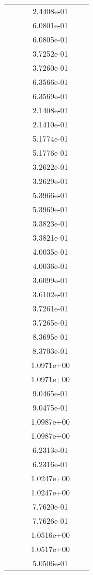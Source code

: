\begin{xltabular}{\textwidth}{r|rS[table-format=1.3e+2]S[table-format=1.4e+2]S[table-format=1.4e+2]S[table-format=-1.5]}
&  &  & 2.4408e-01 & & \\
&  &  & 6.0801e-01 & & \\
&  &  & 6.0805e-01 & & \\
&  &  & 3.7252e-01 & & \\
&  &  & 3.7260e-01 & & \\
&  &  & 6.3566e-01 & & \\
&  &  & 6.3569e-01 & & \\
&  &  & 2.1408e-01 & & \\
&  &  & 2.1410e-01 & & \\
&  &  & 5.1774e-01 & & \\
&  &  & 5.1776e-01 & & \\
&  &  & 3.2622e-01 & & \\
&  &  & 3.2629e-01 & & \\
&  &  & 5.3966e-01 & & \\
&  &  & 5.3969e-01 & & \\
&  &  & 3.3823e-01 & & \\
&  &  & 3.3821e-01 & & \\
&  &  & 4.0035e-01 & & \\
&  &  & 4.0036e-01 & & \\
&  &  & 3.6099e-01 & & \\
&  &  & 3.6102e-01 & & \\
&  &  & 3.7261e-01 & & \\
&  &  & 3.7265e-01 & & \\
&  &  & 8.3695e-01 & & \\
&  &  & 8.3703e-01 & & \\
&  &  & 1.0971e+00 & & \\
&  &  & 1.0971e+00 & & \\
&  &  & 9.0465e-01 & & \\
&  &  & 9.0475e-01 & & \\
&  &  & 1.0987e+00 & & \\
&  &  & 1.0987e+00 & & \\
&  &  & 6.2313e-01 & & \\
&  &  & 6.2316e-01 & & \\
&  &  & 1.0247e+00 & & \\
&  &  & 1.0247e+00 & & \\
&  &  & 7.7620e-01 & & \\
&  &  & 7.7626e-01 & & \\
&  &  & 1.0516e+00 & & \\
&  &  & 1.0517e+00 & & \\
&  &  & 5.0506e-01 & & \\

\end{xltabular}
